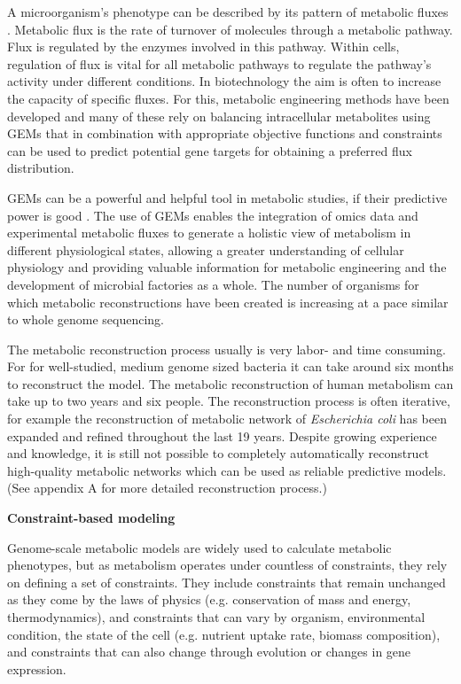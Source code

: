 A microorganism's phenotype can be described by its pattern of metabolic fluxes \cite{Kerkhoven2014}. 
Metabolic flux is the rate of turnover of molecules through a metabolic pathway. Flux is regulated by the enzymes involved in this pathway. Within cells, 
regulation of flux is vital for all metabolic pathways to regulate the pathway's activity under different conditions. \cite{Voet1995} In biotechnology the aim is often 
to increase the capacity of specific fluxes. For this, metabolic engineering methods have been developed and many of these 
rely on balancing intracellular metabolites using GEMs that in
combination with appropriate objective functions and constraints can be used to predict potential gene 
targets for obtaining a preferred flux distribution. \cite{Kerkhoven2014} 

GEMs can be a powerful and helpful tool in metabolic studies, if their predictive 
power is good \cite{Rekena2023}. The use of GEMs enables the integration of omics data and experimental metabolic fluxes to generate a holistic 
view of metabolism in different physiological states, allowing a greater understanding of cellular physiology and providing valuable information 
for metabolic engineering and the development of microbial factories as a whole. \cite{DeBiaggi2023} The number of organisms for which metabolic 
reconstructions have been created is increasing at a pace similar to whole genome sequencing. \cite{Thiele2010}

The metabolic reconstruction process usually is very labor- and time consuming. For for well-studied, medium genome sized bacteria it can take around six months to reconstruct the model. The  
metabolic reconstruction of human metabolism can take up to two years and six people. The reconstruction process is often iterative, for example the reconstruction of metabolic 
network of \textit{Escherichia coli} has been expanded and refined throughout the last 19 years. Despite growing experience and 
knowledge, it is still not possible to completely automatically reconstruct high-quality metabolic networks which can be used as reliable predictive models. \cite{Thiele2010} 
(See appendix A for more detailed reconstruction process.) 


\textbf{Constraint-based modeling}

Genome-scale metabolic models are widely used to calculate metabolic phenotypes, but as metabolism operates under countless of constraints, they rely on defining a set of constraints. 
They include constraints that 
remain unchanged as they come by the laws of physics (e.g. conservation of mass and energy, thermodynamics), 
and constraints that can vary by organism, environmental condition, the state of the 
cell (e.g. nutrient uptake rate, biomass composition), and constraints that can also change through evolution or 
changes in gene expression. \cite{Kerkhoven2022}

